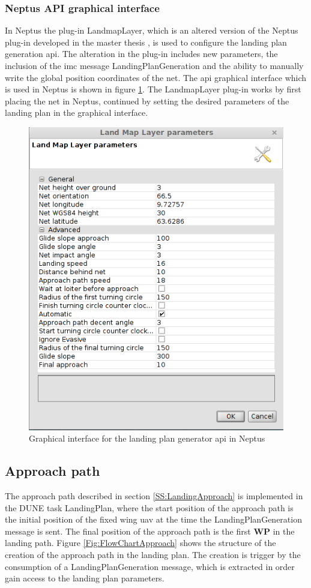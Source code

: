 \subsubsection{Neptus API graphical interface}
In Neptus the plug-in LandmapLayer, which is an altered version of the Neptus plug-in developed in the master thesis \citep{Froelich}, is used to configure the landing plan generation \gls{api}. The alteration in the plug-in includes new parameters, the inclusion of the \gls{imc} message LandingPlanGeneration and the ability to manually write the global position coordinates of the net. The \gls{api} graphical interface which is used in Neptus is shown in figure \ref{Fig:LandMapLayer}. The LandmapLayer plug-in works by first placing the net in Neptus, continued by setting the desired parameters of the landing plan in the graphical interface.
\begin{figure}[H]
\centering
\includegraphics[scale=0.6]{figs/LandMapLayer.png}
\caption{Graphical interface for the landing plan  generator \gls{api} in Neptus}
\label{Fig:LandMapLayer}
\end{figure}
\subsection{Approach path}
The approach path described in section \ref{SS:LandingApproach} is implemented in the DUNE task LandingPlan, where the start position of the approach path is the initial position of the fixed wing \gls{uav} at the time the LandingPlanGeneration message is sent. The final position of the approach path is the first $\textbf{WP}$ in the landing path. Figure \ref{Fig:FlowChartApproach} shows the structure of the creation of the approach path in the landing plan. The creation is trigger by the consumption of a LandingPlanGeneration message, which is extracted in order gain access to the landing plan parameters. 

